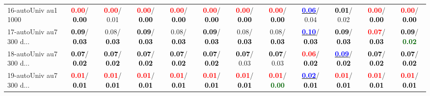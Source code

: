 \begin{table}[h]
\begin{center}
{\begin{tabular}{lc|c|c|c|c|c|c|c|c|c|c}
16-autoUniv au1 1000 & \textcolor{red}{\textbf{  0.00}}/\textcolor{black}{\textbf{  0.00}} & \textcolor{red}{\textbf{  0.00}}/  0.01 & \textcolor{red}{\textbf{  0.00}}/\textcolor{black}{\textbf{  0.00}} & \textcolor{red}{\textbf{  0.00}}/\textcolor{black}{\textbf{  0.00}} & \textcolor{red}{\textbf{  0.00}}/\textcolor{black}{\textbf{  0.00}} & \textcolor{red}{\textbf{  0.00}}/\textcolor{black}{\textbf{  0.00}} & \textcolor{red}{\textbf{  0.00}}/\textcolor{black}{\textbf{  0.00}} & \underline{\textcolor{blue}{\textbf{  0.06}}}/  0.04 & \textcolor{black}{\textbf{  0.01}}/  0.02 & \textcolor{red}{\textbf{  0.00}}/\textcolor{black}{\textbf{  0.00}} & \textcolor{red}{\textbf{  0.00}}/\textcolor{black}{\textbf{  0.00}} \\
17-autoUniv au7 300 d... & \textcolor{black}{\textbf{  0.09}}/\textcolor{black}{\textbf{  0.03}} &   0.08/\textcolor{black}{\textbf{  0.03}} & \textcolor{black}{\textbf{  0.09}}/\textcolor{black}{\textbf{  0.03}} &   0.08/\textcolor{black}{\textbf{  0.03}} & \textcolor{black}{\textbf{  0.09}}/\textcolor{black}{\textbf{  0.03}} &   0.08/\textcolor{black}{\textbf{  0.03}} &   0.08/\textcolor{black}{\textbf{  0.03}} & \underline{\textcolor{blue}{\textbf{  0.10}}}/\textcolor{black}{\textbf{  0.03}} & \textcolor{black}{\textbf{  0.09}}/\textcolor{black}{\textbf{  0.03}} & \textcolor{red}{\textbf{  0.07}}/\textcolor{black}{\textbf{  0.03}} & \textcolor{black}{\textbf{  0.09}}/\textcolor{darkgreen}{\textbf{  0.02}} \\
18-autoUniv au7 300 d... & \textcolor{black}{\textbf{  0.07}}/\textcolor{black}{\textbf{  0.02}} & \textcolor{black}{\textbf{  0.07}}/\textcolor{black}{\textbf{  0.02}} & \textcolor{black}{\textbf{  0.07}}/\textcolor{black}{\textbf{  0.02}} & \textcolor{black}{\textbf{  0.07}}/\textcolor{black}{\textbf{  0.02}} & \textcolor{black}{\textbf{  0.07}}/\textcolor{black}{\textbf{  0.02}} & \textcolor{black}{\textbf{  0.07}}/  0.03 & \textcolor{black}{\textbf{  0.07}}/  0.03 & \textcolor{red}{\textbf{  0.06}}/\textcolor{black}{\textbf{  0.02}} & \underline{\textcolor{blue}{\textbf{  0.09}}}/\textcolor{black}{\textbf{  0.02}} & \textcolor{black}{\textbf{  0.07}}/\textcolor{black}{\textbf{  0.02}} & \textcolor{black}{\textbf{  0.07}}/\textcolor{black}{\textbf{  0.02}} \\
19-autoUniv au7 300 d... & \textcolor{red}{\textbf{  0.01}}/\textcolor{black}{\textbf{  0.01}} & \textcolor{red}{\textbf{  0.01}}/\textcolor{black}{\textbf{  0.01}} & \textcolor{red}{\textbf{  0.01}}/\textcolor{black}{\textbf{  0.01}} & \textcolor{red}{\textbf{  0.01}}/\textcolor{black}{\textbf{  0.01}} & \textcolor{red}{\textbf{  0.01}}/\textcolor{black}{\textbf{  0.01}} & \textcolor{red}{\textbf{  0.01}}/\textcolor{black}{\textbf{  0.01}} & \textcolor{red}{\textbf{  0.01}}/\textcolor{darkgreen}{\textbf{  0.00}} & \underline{\textcolor{blue}{\textbf{  0.02}}}/\textcolor{black}{\textbf{  0.01}} & \textcolor{red}{\textbf{  0.01}}/\textcolor{black}{\textbf{  0.01}} & \textcolor{red}{\textbf{  0.01}}/\textcolor{black}{\textbf{  0.01}} & \textcolor{red}{\textbf{  0.01}}/\textcolor{black}{\textbf{  0.01}} \\

\end{tabular}}
\end{center}
\end{table}
